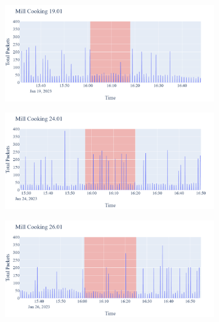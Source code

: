 \begin{figure}[H]
\begin{subfigure}[b]{0.5\textwidth}
    \end{subfigure}
    \begin{subfigure}[b]{0.5\textwidth}
        \centering
        \includegraphics[width=1.2\hsize]{figures/Mill_Cooking_Packets_19.01.png}
    \end{subfigure}
    \begin{subfigure}[b]{0.5\textwidth}
        \centering
        \includegraphics[width=1.2\hsize]{figures/Mill_Cooking_Packets_24.01.png}
    \end{subfigure}
    \begin{subfigure}[b]{0.5\textwidth}
        \centering
        \includegraphics[width=1.2\hsize]{figures/Mill_Cooking_Packets_26.01.png}
    \end{subfigure}
    \begin{subfigure}[b]{0.5\textwidth}

\end{subfigure}
\end{figure}
